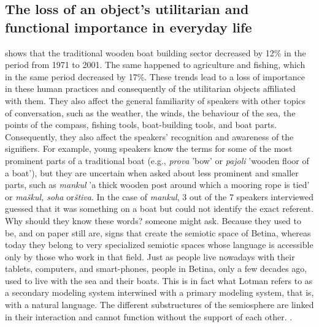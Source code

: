 \documentclass[output=paper]{LSP/langsci}
\begin{document}
\subsection{The loss of an object’s utilitarian and functional importance in everyday life}
 shows that the traditional wooden boat building sector decreased by 12\% in the period from 1971 to 2001. The same happened to agriculture and fishing, which in the same period decreased by 17\%. These trends lead to a loss of importance in these human practices and consequently of the utilitarian objects affiliated with them. They also affect the general familiarity of speakers with other topics of conversation, such as the weather, the winds, the behaviour of the sea, the points of the compass, fishing tools, boat-building tools, and boat parts. Consequently, they also affect the speakers’ recognition and awareness of the signifiers. For example, young speakers know the terms for some of the most prominent parts of a traditional boat (e.g.,  \textit{prova} 'bow' or \textit{pajoli} 'wooden floor of a boat'), but they are uncertain when asked about less prominent and smaller parts, such as \textit{mankul }'a thick wooden post around which a mooring rope is tied' or \textit{maškul, soha }or\textit{štiva}. In the case of \textit{mankul}, 3 out of the 7 speakers interviewed guessed that it was something on a boat but could not identify the exact referent. Why should they know these words? someone might ask. Because they used to be, and on paper still are, signs that create the semiotic space of Betina, whereas today they belong to very specialized semiotic spaces whose language is accessible only by those who work in that field. Just as people live nowadays with their tablets, computers, and smart-phones, people in Betina, only a few decades ago, used to live with the sea and their boats. This is in fact what Lotman refers to as a secondary modeling system interwined with a primary modeling system, that is, with a natural language. The different substructures of the semiosphere are linked in their interaction and cannot function without the support of each other. \citep[219]{lotman_semiosphere_1985}.
\end{document}
